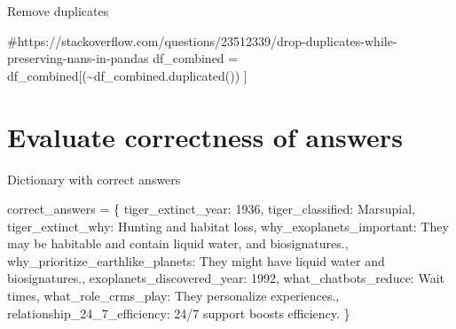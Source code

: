 \documentclass[
  letterpaper,
  DIV=11,
  numbers=noendperiod]{scrartcl}
\newenvironment{Shaded}{\begin{snugshade}}{\end{snugshade}}
\newcommand{\CommentTok}[1]{\textcolor[rgb]{0.37,0.37,0.37}{#1}}
\newcommand{\NormalTok}[1]{\textcolor[rgb]{0.00,0.23,0.31}{#1}}
\newcommand{\OperatorTok}[1]{\textcolor[rgb]{0.37,0.37,0.37}{#1}}
\newcommand{\StringTok}[1]{\textcolor[rgb]{0.13,0.47,0.30}{#1}}
\begin{document}
Remove duplicates

\begin{Shaded}
\begin{Highlighting}[]
\CommentTok{\#https://stackoverflow.com/questions/23512339/drop{-}duplicates{-}while{-}preserving{-}nans{-}in{-}pandas}
\NormalTok{df\_combined }\OperatorTok{=}\NormalTok{ df\_combined[(}\OperatorTok{\textasciitilde{}}\NormalTok{df\_combined.duplicated()) ]}
\end{Highlighting}
\end{Shaded}

\section{Evaluate correctness of
answers}\label{evaluate-correctness-of-answers}

Dictionary with correct answers

\begin{Shaded}
\begin{Highlighting}[]
\NormalTok{correct\_answers }\OperatorTok{=}\NormalTok{ \{}
    \StringTok{\textquotesingle{}tiger\_extinct\_year\textquotesingle{}}\NormalTok{: }\StringTok{\textquotesingle{}1936\textquotesingle{}}\NormalTok{,}
    \StringTok{\textquotesingle{}tiger\_classified\textquotesingle{}}\NormalTok{: }\StringTok{\textquotesingle{}Marsupial\textquotesingle{}}\NormalTok{,}
    \StringTok{\textquotesingle{}tiger\_extinct\_why\textquotesingle{}}\NormalTok{: }\StringTok{\textquotesingle{}Hunting and habitat loss\textquotesingle{}}\NormalTok{,}
    \StringTok{\textquotesingle{}why\_exoplanets\_important\textquotesingle{}}\NormalTok{: }
      \StringTok{\textquotesingle{}They may be habitable and contain liquid water, and biosignatures.\textquotesingle{}}\NormalTok{,}
    \StringTok{\textquotesingle{}why\_prioritize\_earthlike\_planets\textquotesingle{}}\NormalTok{: }
      \StringTok{\textquotesingle{}They might have liquid water and biosignatures.\textquotesingle{}}\NormalTok{,}
    \StringTok{\textquotesingle{}exoplanets\_discovered\_year\textquotesingle{}}\NormalTok{: }\StringTok{\textquotesingle{}1992\textquotesingle{}}\NormalTok{,}
    \StringTok{\textquotesingle{}what\_chatbots\_reduce\textquotesingle{}}\NormalTok{: }\StringTok{\textquotesingle{}Wait times\textquotesingle{}}\NormalTok{,}
    \StringTok{\textquotesingle{}what\_role\_crms\_play\textquotesingle{}}\NormalTok{: }\StringTok{\textquotesingle{}They personalize experiences.\textquotesingle{}}\NormalTok{,}
    \StringTok{\textquotesingle{}relationship\_24\_7\_efficiency\textquotesingle{}}\NormalTok{: }\StringTok{\textquotesingle{}24/7 support boosts efficiency.\textquotesingle{}}
\NormalTok{\}}
\end{Highlighting}
\end{Shaded}
\end{document}
